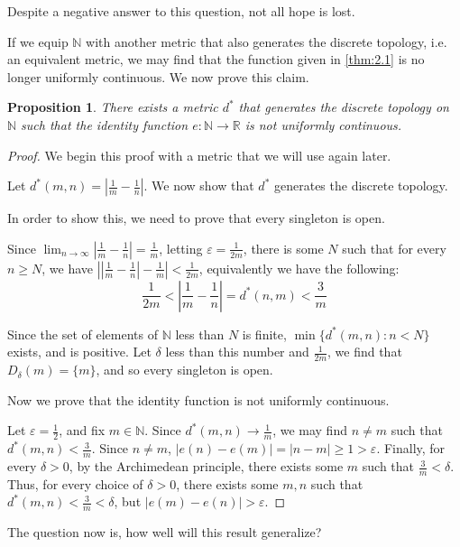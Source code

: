 \documentclass[openany, amssymb, psamsfonts]{amsart}
\let\fullref\autoref
\newtheorem{prop}{Proposition}[section]
\theoremstyle{definition}
\numberwithin{equation}{section}
\begin{document}
Despite a negative answer to this question, not all hope is lost.  

If we equip $\mathbb N$ with another metric that also generates the discrete topology, i.e. an equivalent metric, we may find that the function given in \fullref{thm:2.1} is no longer uniformly continuous. We now prove this claim.

\begin{prop}\label{pro:2.2}
  There exists a metric $d^\ast$ that generates the discrete topology on $\mathbb N$ such that the identity function $e: \mathbb N \to \mathbb R$ is not uniformly continuous. 
\end{prop}
\begin{proof}[Proof]
  We begin this proof with a metric that we will use again later. 

  Let $d^\ast(m,n) = \left| \frac1{m} - \frac1{n}\right| $. We now show that $d^\ast$ generates the discrete topology. 

  In order to show this, we need to prove that every singleton is open. 

  Since $\displaystyle\lim_{n \to \infty} \left| \frac1{m} - \frac1{n}\right| = \frac1{m}$, letting $\varepsilon = \frac1{2m}$, there is some $N$ such that for every $n \ge N$, we have $\left| \left|\frac1{m} - \frac1{n}\right| - \frac1{m}\right| < \frac1{2m}$, equivalently we have the following: 
  \[ \frac1{2m} < \left| \frac1{m} - \frac1{n}\right| = d^\ast(n,m) < \frac3{m} \]

  Since the set of elements of $\mathbb N$ less than $N$ is finite, $\min\{d^\ast(m,n) : n < N\}$ exists, and is positive. Let $\delta$  less than this number and $\frac{1}{2m}$, we find that $D_\delta (m) = \{m \}$, and so every singleton is open. 
  
  Now we prove that the identity function is not uniformly continuous. 

  Let $\varepsilon = \frac12$, and fix $m \in \mathbb N$. Since $d^\ast(m,n) \to \frac1{m}$, we may find $n\neq m$ such that $d^\ast(m,n) < \frac{3}{m}$. Since $n\neq m$, $|e(n)-e(m)| = |n-m| \ge 1 > \varepsilon$. Finally, for every $\delta >0$, by the Archimedean principle, there exists some $m$ such that $\frac3{m} < \delta$. Thus, for every choice of $\delta>0$, there exists some $m,n$ such that $d^\ast(m,n) < \frac3{m} < \delta$, but $|e(m) - e(n)| > \varepsilon$.
\end{proof}

The question now is, how well will this result generalize? 
\end{document}
